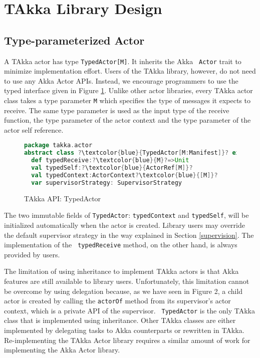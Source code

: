 \section{TAkka Library Design}


\subsection{Type-parameterized Actor}
\label{actor}
A TAkka actor has type {\tt TypedActor[M]}.  It inherits the Akka {\tt
Actor} trait to minimize implementation effort.  Users of the TAkka library,
however, do not need to use any Akka Actor APIs.  Instead, we encourage
programmers to use the typed interface given in Figure \ref{takka_actor_api}. 
 Unlike other actor libraries, every TAkka actor class takes a type parameter 
{\tt M} which specifies the type of messages it expects to receive.  The same 
type parameter is used as the input type of the receive function, the type 
parameter of the actor context and the type parameter of the actor self reference.

\begin{figure}
\label{takka_actor_api}
\begin{lstlisting}[language=scala, escapechar=?]
package takka.actor
abstract class ?\textcolor{blue}{TypedActor[M:Manifest]}? extends akka.actor.Actor
  def typedReceive:?\textcolor{blue}{M}?=>Unit
  val typedSelf:?\textcolor{blue}{ActorRef[M]}?
  val typedContext:ActorContext?\textcolor{blue}{[M]}?
  var supervisorStrategy: SupervisorStrategy
\end{lstlisting}
\caption{TAkka API: TypedActor}
\end{figure}

The two immutable fields of {\tt TypedActor}: {\tt typedContext} and 
{\tt typedSelf}, will be initialized automatically when the actor is created.
Library users may override the default supervisor strategy in the
way explained in Section \ref{supervision}.  The implementation of the {\tt
typedReceive} method, on the other hand, is always provided by users.

The limitation of using inheritance to implement TAkka actors is that Akka 
features are still available to library users.  Unfortunately, this limitation 
cannot be overcome by using delegation because, as we have seen in Figure 2, 
a child actor is created by calling the {\tt actorOf} method from its 
supervisor's actor context, which is a private API of the supervisor.  {\tt 
TypedActor} is the only TAkka class that is implemented using inheritance. 
Other TAkka classes are either implemented by delegating tasks to Akka 
counterparts or rewritten in TAkka.  Re-implementing the TAkka 
Actor library requires a similar amount of work for implementing the Akka Actor 
library.


